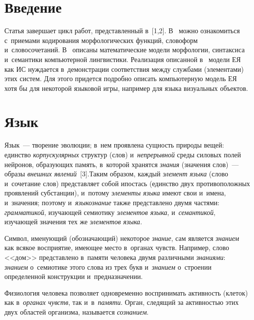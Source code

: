 
\thispagestyle{headings}

\begin{multicols}{2}

\label{st\stat}

\section{Введение}

  Статья завершает цикл работ, представленный в~[1,2]. В~\cite{1-sh} 
можно ознакомиться с~приемами кодирования морфологических функций, 
словоформ и~словосочетаний. В~\cite{2-sh} описаны математические 
модели морфологии, синтаксиса и~семантики компьютерной лингвистики. 
Реализация описанной в~\cite{2-sh} модели ЕЯ как 
ИС нуждается в~демонстрации соответствия 
меж\-ду служ\-ба\-ми (элементами) этих сис\-тем. Для этого придется подробно 
описать компьютерную модель ЕЯ хотя бы для некоторой языковой игры, 
например для языка визуальных объектов.

\section{Язык}

  Язык~--- творение эволюции; в~нем проявлена сущ\-ность природы 
вещей: единство \textit{корпускулярных} структур (слов) 
и~\textit{непрерывной} среды силовых полей нейронов, об\-ра\-зу\-ющих 
память, в~которой хранятся \textit{знания} (значения слов)~--- образы 
\textit{внеш\-них явлений}~[3].Таким образом, каждый \textit{элемент языка} 
(слово и~сочетание слов) пред\-став\-ля\-ет собой ипо\-стась (единство двух 
противоположных про\-яв\-ле\-ний субстанции), и~потому \textit{элементы 
языка} имеют свои и~имена, и~значения; поэтому и~\textit{языкознание} 
также представлено двумя час\-тя\-ми: \textit{грамматикой}, изучающей 
семиотику \textit{элементов языка}, и~\textit{семантикой}, изучающей 
значения тех же \textit{элементов языка}. 
  
  Символ, именующий (обозначающий) некоторое \textit{знание}, сам 
является \textit{знанием} как всякое восприятие, име\-ющее место в~органах 
чувств. Например, слово <<дом>> представлено в~памяти человека двумя 
различными \textit{знаниями}: \textit{знанием} о~семиотике этого слова из 
трех букв и~\textit{знанием} о~стро\-ении определенной конструкции и~предназначении. 
  
  Физиология человека позволяет одновременно воспринимать активность 
(клеток) как в~\textit{органах чувств}, так и~в~\textit{памяти}. Орган, 
следящий за активностью этих двух областей организма, называется 
\textit{со\-зна\-нием}. 
  

\end{multicols}
